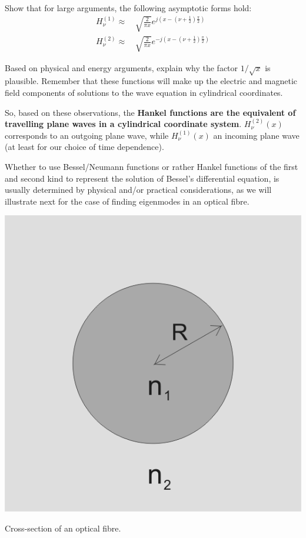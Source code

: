 \begin{exer}
Show that for large arguments, the following asymptotic forms hold:
\begin{align}
H_{\nu}^{(1)} \approx & \, \sqrt{\frac{2}{\pi x}} e^{j \left( x - \left(\nu + \frac{1}{2}\right)\frac{\pi}{2} \right)} \nonumber \\
  H_{\nu}^{(2)} \approx & \, \sqrt{\frac{2}{\pi x}} e^{-j \left( x - \left(\nu + \frac{1}{2}\right)\frac{\pi}{2} \right)}
\end{align}

Based on physical and energy arguments, explain why the factor $1/\sqrt{x}$ is plausible. Remember that these functions will make up the electric and magnetic field components of solutions to the wave equation in cylindrical coordinates.
                          
\end{exer}

So, based on these observations, the \textbf{Hankel functions are the equivalent of travelling plane waves in a cylindrical coordinate system}.   $H_{\nu}^{(2)}(x)$ corresponds to an outgoing plane wave, while $H_{\nu}^{(1)}(x)$ \is an incoming plane wave (at least for our choice of time dependence).

Whether to use Bessel/Neumann functions or rather Hankel functions of the first and second kind to represent the solution of Bessel's differential equation, is usually determined by physical and/or practical considerations, as we will illustrate next for the case of finding eigenmodes in an optical fibre.


\pagebreak




\begin{marginfigure}
\centering
\includegraphics{bessel/figures/fibre}
\caption{Cross-section of an optical fibre.}
\label{fig-fibre}
\end{marginfigure}

